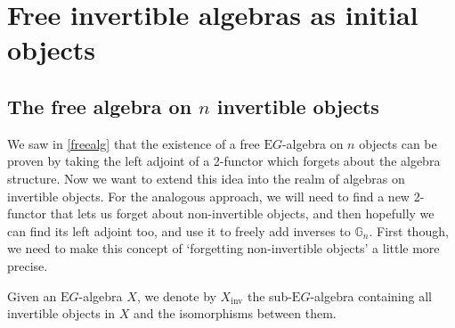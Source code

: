 \section{Free invertible algebras as initial objects}



\subsection{The free algebra on $n$ invertible objects}

We saw in \cref{freealg} that the existence of a free $\mathrm{E}G$-algebra on $n$ objects can be proven by taking the left adjoint of a 2-functor which forgets about the algebra structure. Now we want to extend this idea into the realm of algebras on invertible objects. For the analogous approach, we will need to find a new 2-functor that lets us forget about non-invertible objects, and then hopefully we can find its left adjoint too, and use it to freely add inverses to $\mathbb{G}_n$. First though, we need to make this concept of `forgetting non-invertible objects' a little more precise.

\begin{defn} Given an $\mathrm{E}G$-algebra $X$, we denote by $X_{\mathrm{inv}}$ the sub-$\mathrm{E}G$-algebra containing all invertible objects in $X$ and the isomorphisms between them. \end{defn}

